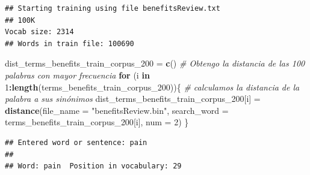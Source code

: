 \documentclass[spanish,]{article}
\newenvironment{Shaded}{\begin{snugshade}}{\end{snugshade}}
\newcommand{\KeywordTok}[1]{\textcolor[rgb]{0.13,0.29,0.53}{\textbf{#1}}}
\newcommand{\DataTypeTok}[1]{\textcolor[rgb]{0.13,0.29,0.53}{#1}}
\newcommand{\DecValTok}[1]{\textcolor[rgb]{0.00,0.00,0.81}{#1}}
\newcommand{\CharTok}[1]{\textcolor[rgb]{0.31,0.60,0.02}{#1}}
\newcommand{\StringTok}[1]{\textcolor[rgb]{0.31,0.60,0.02}{#1}}
\newcommand{\CommentTok}[1]{\textcolor[rgb]{0.56,0.35,0.01}{\textit{#1}}}
\newcommand{\ControlFlowTok}[1]{\textcolor[rgb]{0.13,0.29,0.53}{\textbf{#1}}}
\newcommand{\OperatorTok}[1]{\textcolor[rgb]{0.81,0.36,0.00}{\textbf{#1}}}
\newcommand{\NormalTok}[1]{#1}
\begin{document}
\begin{Shaded}
\end{Shaded}

\begin{verbatim}
## Starting training using file benefitsReview.txt
## 100K
Vocab size: 2314
## Words in train file: 100690
\end{verbatim}

\begin{Shaded}
\begin{Highlighting}[]
\NormalTok{dist_terms_benefits_train_corpus_}\DecValTok{200}\NormalTok{ =}\StringTok{ }\KeywordTok{c}\NormalTok{()}
\CommentTok{# Obtengo la distancia de las 100 palabras con mayor frecuencia}
\ControlFlowTok{for}\NormalTok{ (i }\ControlFlowTok{in} \DecValTok{1}\OperatorTok{:}\KeywordTok{length}\NormalTok{(terms_benefits_train_corpus_}\DecValTok{200}\NormalTok{))\{ }\CommentTok{# calculamos la distancia de la palabra a sus sinónimos}
\NormalTok{  dist_terms_benefits_train_corpus_}\DecValTok{200}\NormalTok{[i] =}\StringTok{ }\KeywordTok{distance}\NormalTok{(}\DataTypeTok{file_name =} \StringTok{"benefitsReview.bin"}\NormalTok{, }\DataTypeTok{search_word =}\NormalTok{ terms_benefits_train_corpus_}\DecValTok{200}\NormalTok{[i], }\DataTypeTok{num =} \DecValTok{2}\NormalTok{)}
\NormalTok{\}}
\end{Highlighting}
\end{Shaded}

\begin{verbatim}
## Entered word or sentence: pain
## 
## Word: pain  Position in vocabulary: 29
\end{verbatim}
\end{document}
